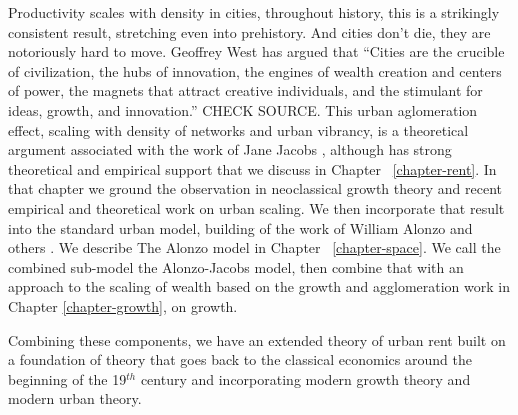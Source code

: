Productivity scales with density in cities, throughout history, this is a strikingly consistent result, stretching even into prehistory. And cities don't die, they are notoriously hard to move.
Geoffrey West has argued that ``Cities are the crucible of civilization, the hubs of innovation, the engines of wealth creation and centers of power, the magnets that attract creative individuals, and the stimulant for ideas, growth, and innovation.'' \cite{westScaleUniversalLaws2017} CHECK SOURCE. This urban aglomeration effect, scaling with density of networks and urban vibrancy, is %
a theoretical argument associated with the work of Jane Jacobs \cite{jacobsEconomyCities1969}, although has strong theoretical and empirical support  \cite{bettencourtGrowthInnovationScaling2007, bettencourtOriginsScalingCities2013, dongUnderstandingMesoscopicScaling2020, loboUrbanScalingProduction2013} that we discuss in Chapter ~\ref{chapter-rent}. In that chapter we ground the observation in  \gls{neoclassical growth theory} and recent empirical and theoretical work on \gls{urban scaling}. We then incorporate that result into the standard urban model, building of the work of %
William Alonzo and others \cite{alonzoTheoryUrbanLand1960}.   We describe The Alonzo model in Chapter ~\ref{chapter-space}. We call the combined sub-model the \gls{Alonzo-Jacobs model}, then combine that with an approach to the scaling of wealth based on the growth and agglomeration work in Chapter \ref{chapter-growth}, on growth.

Combining these components, we have an extended theory of urban rent built on a foundation of theory that goes back to the \gls{classical economics} around the beginning of the 19$^{th}$ century and incorporating modern growth theory and modern urban theory.




